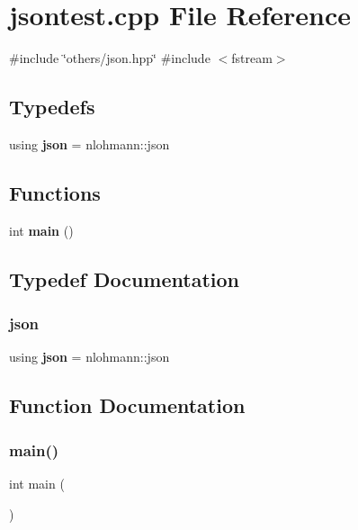 \section{jsontest.\+cpp File Reference}
\label{jsontest_8cpp}
{\ttfamily \#include \char`\"{}others/json.\+hpp\char`\"{}}\newline
{\ttfamily \#include $<$fstream$>$}\newline
\subsection*{Typedefs}
\begin{DoxyCompactItemize}
\item 
using \textbf{ json} = nlohmann\+::json
\end{DoxyCompactItemize}
\subsection*{Functions}
\begin{DoxyCompactItemize}
\item 
int \textbf{ main} ()
\end{DoxyCompactItemize}


\subsection{Typedef Documentation}
\mbox{\label{jsontest_8cpp_ab701e3ac61a85b337ec5c1abaad6742d}} 
\subsubsection{json}
{\footnotesize\ttfamily using \textbf{ json} =  nlohmann\+::json}



\subsection{Function Documentation}
\mbox{\label{jsontest_8cpp_ae66f6b31b5ad750f1fe042a706a4e3d4}} 
\subsubsection{main()}
{\footnotesize\ttfamily int main (\begin{DoxyParamCaption}{ }\end{DoxyParamCaption})}

